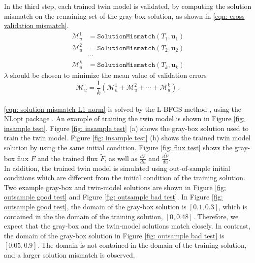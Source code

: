 In the third step, each trained twin model is validated, by computing
the solution mismatch on the remaining set of the gray-box solution, as shown in 
\eqref{eqn: cross validation mismatch}.
\begin{equation}\begin{split}
    \mathcal{M}_u^1 &= \texttt{SolutionMismatch}\left( T_1 , \boldsymbol{u}_1\right)\\
    \mathcal{M}_u^2 &= \texttt{SolutionMismatch}\left( T_2 , \boldsymbol{u}_2\right)\\
    &\cdots\\
    \mathcal{M}_u^k &= \texttt{SolutionMismatch}\left( T_k , \boldsymbol{u}_k\right)
    \label{eqn: cross validation mismatch}
\end{split}\end{equation}
$\lambda$ should be chosen to minimize
the mean value of validation errors
\begin{equation}
    \overline{\mathcal{M}}_u = \frac{1}{k}\left(\mathcal{M}_u^1 + \mathcal{M}_u^2 + \cdots 
    + \mathcal{M}_u^k\right)\,.
    \label{eqn: cross validation error mean}
\end{equation}\\


\eqref{eqn: solution mismatch L1 norm} is solved by the L-BFGS method \cite{LBFGS}, using the
NLopt package \cite{nlopt}.
An example of training the twin model is shown in Figure \ref{fig: insample test}.
Figure \ref{fig: insample test} (a) shows the gray-box solution used to train the twin model. 
Figure \ref{fig: insample test} (b) shows the trained twin model solution by using the same initial condition.
Figure \ref{fig: flux test} shows the gray-box flux $F$ and the trained flux $\tilde{F}$, as well as
$\frac{dF}{du}$ and $\frac{d\tilde{F}}{du}$.\\

In addition, the trained twin model is simulated using out-of-sample initial conditions which
are different from the initial condition of the training solution. 
Two example gray-box
and twin-model solutions are shown in Figure \ref{fig: outsample good test} and Figure \ref{fig: outsample bad test}.
In Figure \ref{fig: outsample good test}, the domain of the gray-box solution is $[0.1, 0.3]$, which
is contained in the the domain of the training solution, $[0,0.48]$.
Therefore, we expect that the gray-box and the twin-model
solutions match closely. In contrast, the domain of the gray-box solution in Figure 
\ref{fig: outsample bad test} is $[0.05,0.9]$. The domain is not contained 
in the domain of the training solution, and a larger solution mismatch is observed.\\

